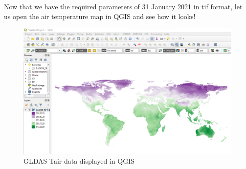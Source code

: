Now that we have the required parameters of 31 January 2021 in tif format, let us open the air temperature map in QGIS and see how it looks!
\begin{figure}[H]
\begin{center}
\includegraphics[scale=0.6]{qgis1.png} %
\end{center}
\caption{GLDAS Tair data displayed in QGIS}
\label{GLDAS Tair data displayed in QGIS}%
\end{figure}
